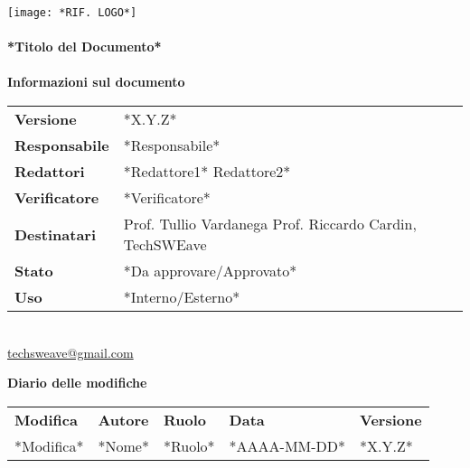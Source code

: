 \documentclass[a4paper]{article}
\begin{document}
\begin{titlepage}
    \begin{center}
        \texttt{[image: *RIF. LOGO*]}\\
        \vspace{20px}
        \textcolor{logo}{\hrulefill}\\
        \vspace{20px}
        \textbf{\huge\textcolor{logo}{*Titolo del Documento*}}\\
        \vspace{10px}
        \textcolor{logo}{\hrulefill}\\
        \vspace{40px}
        \textbf{\Large Informazioni sul documento}\\
        \vspace{20px}
        \begin{tabular}{p{100px} | p{100px}}
            \textbf{Versione} & *X.Y.Z*\\
            \textbf{Responsabile} & *Responsabile*\\
            \textbf{Redattori} & *Redattore1* \newline *Redattore2*\\
            \textbf{Verificatore} & *Verificatore*\\
            \textbf{Destinatari} & Prof. Tullio Vardanega \newline Prof. Riccardo Cardin, \newline TechSWEave\\
            \textbf{Stato} & *Da approvare/Approvato*\\
            \textbf{Uso} & *Interno/Esterno*\\
        \end{tabular}\\
        \vspace{60px}
        \href{mailto:techsweave@gmail.com}{techsweave@gmail.com}\\

    \end{center}
    \end{titlepage}

    \begin{center}
        \textbf{\Large Diario delle modifiche}\\
        \vspace{10px}
        \begin{table}[h!]
        \centering
        \renewcommand{\arraystretch}{1.8}
        \begin{tabular}{p{150px} p{90px} p{50px} p{60px} p{45px}}
            \rowcolor{logo!70} \textbf{Modifica} & \textbf{Autore} & \textbf{Ruolo} & \textbf{Data} & \textbf{Versione}\\
            *Modifica* & *Nome* & *Ruolo* & *AAAA-MM-DD* & *X.Y.Z* \\    
        \end{tabular}
    \end{table}
    \end{center}

    \newpage
    \tableofcontents
    \newpage
\end{document}
